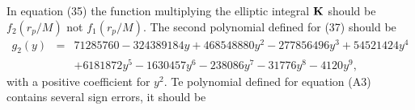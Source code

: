 \documentclass[aps,prd,amsfonts,amssymb,amsmath,nofootinbib,reprint,showpacs]{revtex4-1}
\begin{document}
In equation (35) the function multiplying the elliptic integral $\bf{K}$ should be $f_2(r_p/M)$ not $f_1(r_p/M)$.
The second polynomial defined for (37) should be
\begin{eqnarray}
g_2(y) & = & 71285760-324389184 y+468548880 y^2-277856496 y^3+54521424 y^4 \nonumber \\
 & & + {} 6181872 y^5-1630457 y^6-238086 y^7-31776 y^8-4120 y^9,
\end{eqnarray}
with a positive coefficient for $y^2$. Te polynomial defined for equation (A3) contains several sign errors, it should be
\end{document}
